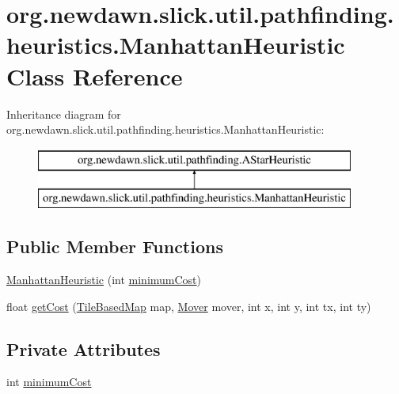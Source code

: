 \hypertarget{classorg_1_1newdawn_1_1slick_1_1util_1_1pathfinding_1_1heuristics_1_1_manhattan_heuristic}{}\section{org.\+newdawn.\+slick.\+util.\+pathfinding.\+heuristics.\+Manhattan\+Heuristic Class Reference}
\label{classorg_1_1newdawn_1_1slick_1_1util_1_1pathfinding_1_1heuristics_1_1_manhattan_heuristic}
Inheritance diagram for org.\+newdawn.\+slick.\+util.\+pathfinding.\+heuristics.\+Manhattan\+Heuristic\+:\begin{figure}[H]
\begin{center}
\leavevmode
\includegraphics[height=2.000000cm]{classorg_1_1newdawn_1_1slick_1_1util_1_1pathfinding_1_1heuristics_1_1_manhattan_heuristic}
\end{center}
\end{figure}
\subsection*{Public Member Functions}
\begin{DoxyCompactItemize}
\item 
\mbox{\hyperlink{classorg_1_1newdawn_1_1slick_1_1util_1_1pathfinding_1_1heuristics_1_1_manhattan_heuristic_a84454e3742e506767479223dbae1a36f}{Manhattan\+Heuristic}} (int \mbox{\hyperlink{classorg_1_1newdawn_1_1slick_1_1util_1_1pathfinding_1_1heuristics_1_1_manhattan_heuristic_aa9c2d604c30d1ab8c31672ea5daeef40}{minimum\+Cost}})
\item 
float \mbox{\hyperlink{classorg_1_1newdawn_1_1slick_1_1util_1_1pathfinding_1_1heuristics_1_1_manhattan_heuristic_a9ff77608b7c1a2b33cce627c5495b39e}{get\+Cost}} (\mbox{\hyperlink{interfaceorg_1_1newdawn_1_1slick_1_1util_1_1pathfinding_1_1_tile_based_map}{Tile\+Based\+Map}} map, \mbox{\hyperlink{interfaceorg_1_1newdawn_1_1slick_1_1util_1_1pathfinding_1_1_mover}{Mover}} mover, int x, int y, int tx, int ty)
\end{DoxyCompactItemize}
\subsection*{Private Attributes}
\begin{DoxyCompactItemize}
\item 
int \mbox{\hyperlink{classorg_1_1newdawn_1_1slick_1_1util_1_1pathfinding_1_1heuristics_1_1_manhattan_heuristic_aa9c2d604c30d1ab8c31672ea5daeef40}{minimum\+Cost}}
\end{DoxyCompactItemize}


